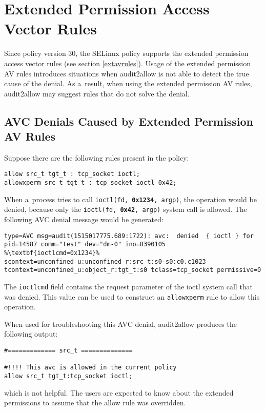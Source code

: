 \section{Extended Permission Access Vector Rules}
\label{xpermsanalysis}
Since policy version 30, the SELinux policy supports the extended permission
access vector rules (see section \ref{extavrules}). Usage of the extended
permission AV rules introduces situations when audit2allow is not able to detect
the true cause of the denial. As a~result, when using the extended permission AV
rules, audit2allow may suggest rules that do not solve the denial.

\subsection{AVC Denials Caused by Extended Permission AV Rules}
Suppose there are the following rules present in the policy:
\begin{lstlisting}
allow src_t tgt_t : tcp_socket ioctl;
allowxperm src_t tgt_t : tcp_socket ioctl 0x42;
\end{lstlisting}
When a~process tries to call \texttt{ioctl(fd, \textbf{0x1234}, argp)}, the
operation would be denied, because only the \texttt{ioctl(fd, \textbf{0x42},
argp)} system call is allowed. The following AVC denial message would be
generated:
\begin{lstlisting}[escapechar=\%]
type=AVC msg=audit(1515017775.689:1722): avc:  denied  { ioctl } for
pid=14587 comm="test" dev="dm-0" ino=8390105 %\textbf{ioctlcmd=0x1234}%
scontext=unconfined_u:unconfined_r:src_t:s0-s0:c0.c1023
tcontext=unconfined_u:object_r:tgt_t:s0 tclass=tcp_socket permissive=0
\end{lstlisting}
The \texttt{ioctlcmd} field contains the request parameter of the ioctl system
call that was denied. This value can be used to construct an \texttt{allowxperm}
rule to allow this operation.

When used for troubleshooting this AVC denial, audit2allow produces the
following output:
\begin{lstlisting}
#============= src_t ==============

#!!!! This avc is allowed in the current policy
allow src_t tgt_t:tcp_socket ioctl;
\end{lstlisting}
which is not helpful. The users are expected to know about the extended
permissions to assume that the allow rule was overridden.

